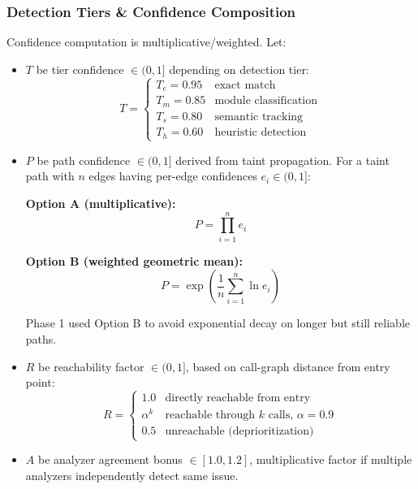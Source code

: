 \subsubsection{Detection Tiers \& Confidence Composition}

Confidence computation is multiplicative/weighted. Let:

\begin{itemize}
    \item $T$ be tier confidence $\in (0,1]$ depending on detection tier:
    \begin{equation}
    T = \begin{cases}
    T_e = 0.95 & \text{exact match} \\
    T_m = 0.85 & \text{module classification} \\
    T_s = 0.80 & \text{semantic tracking} \\
    T_h = 0.60 & \text{heuristic detection}
    \end{cases}
    \label{eq:tier_confidence}
    \end{equation}

    \item $P$ be path confidence $\in (0,1]$ derived from taint propagation. For a taint path with $n$ edges having per-edge confidences $e_i \in (0,1]$:

    \textbf{Option A (multiplicative):}
    \begin{equation}
    P = \prod_{i=1}^{n} e_i
    \label{eq:path_mult}
    \end{equation}

    \textbf{Option B (weighted geometric mean):}
    \begin{equation}
    P = \exp\left(\frac{1}{n} \sum_{i=1}^{n} \ln e_i\right)
    \label{eq:path_geom}
    \end{equation}

    Phase 1 used Option B to avoid exponential decay on longer but still reliable paths.

    \item $R$ be reachability factor $\in (0,1]$, based on call-graph distance from entry point:
    \begin{equation}
    R = \begin{cases}
    1.0 & \text{directly reachable from entry} \\
    \alpha^k & \text{reachable through } k \text{ calls, } \alpha = 0.9 \\
    0.5 & \text{unreachable (deprioritization)}
    \end{cases}
    \label{eq:reachability}
    \end{equation}

    \item $A$ be analyzer agreement bonus $\in [1.0, 1.2]$, multiplicative factor if multiple analyzers independently detect same issue.
\end{itemize}

